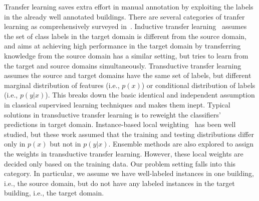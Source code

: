 Transfer learning saves extra effort in manual annotation by exploiting the labels in the already well annotated buildings.
There are several categories of tranfer learning as comprehensively surveyed in~\cite{transfer1}.
Inductive transfer learning~\cite{transfer2} assumes the set of class labels in the target domain is different from the source domain, and aims at achieving high performance in the target domain by transferring knowledge from the source domain \cite{multitask} has a similar setting, but tries to learn from the target and source domains simultaneously.
Transductive transfer learning~\cite{transfer3} assumes the source and target domains have the same set of labels, but different marginal distribution of features (i.e., $p(x)$) or conditional distribution of labels (i.e., $p(y|x)$). This breaks down the basic identical and independent assumption in classical supervised learning techniques and makes them inept. Typical solutions in transductive transfer learning is to reweight the classifiers' predictions in target domain. Instance-based local weighting~\cite{weight1,weight2,weight3} has been well studied, but these work assumed that the training and testing distributions differ only in $p(x)$ but not in $p(y|x)$. Ensemble methods are also explored to assign the weights \cite{ensem1,ensem2} in transductive transfer learning. However, these local weights are decided only based on the training data.
Our problem setting falls into this category. In particular, we assume we have well-labeled instances in one building, i.e., the source domain, but do not have any labeled instances in the target building, i.e., the target domain.



